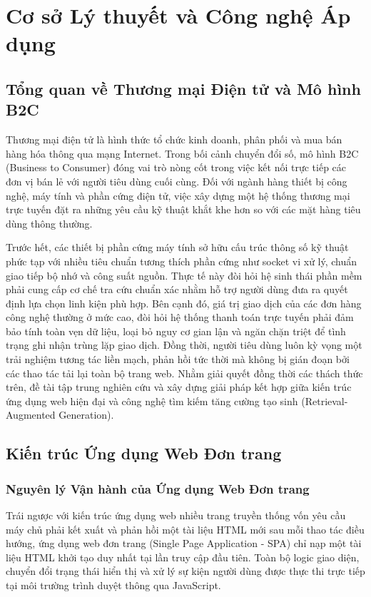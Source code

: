 \chapter{Cơ sở Lý thuyết và Công nghệ Áp dụng}

\section{Tổng quan về Thương mại Điện tử và Mô hình B2C}
Thương mại điện tử là hình thức tổ chức kinh doanh, phân phối và mua bán hàng hóa thông qua mạng Internet. Trong bối cảnh chuyển đổi số, mô hình B2C (Business to Consumer) đóng vai trò nòng cốt trong việc kết nối trực tiếp các đơn vị bán lẻ với người tiêu dùng cuối cùng. Đối với ngành hàng thiết bị công nghệ, máy tính và phần cứng điện tử, việc xây dựng một hệ thống thương mại trực tuyến đặt ra những yêu cầu kỹ thuật khắt khe hơn so với các mặt hàng tiêu dùng thông thường.

Trước hết, các thiết bị phần cứng máy tính sở hữu cấu trúc thông số kỹ thuật phức tạp với nhiều tiêu chuẩn tương thích phần cứng như socket vi xử lý, chuẩn giao tiếp bộ nhớ và công suất nguồn. Thực tế này đòi hỏi hệ sinh thái phần mềm phải cung cấp cơ chế tra cứu chuẩn xác nhằm hỗ trợ người dùng đưa ra quyết định lựa chọn linh kiện phù hợp. Bên cạnh đó, giá trị giao dịch của các đơn hàng công nghệ thường ở mức cao, đòi hỏi hệ thống thanh toán trực tuyến phải đảm bảo tính toàn vẹn dữ liệu, loại bỏ nguy cơ gian lận và ngăn chặn triệt để tình trạng ghi nhận trùng lặp giao dịch. Đồng thời, người tiêu dùng luôn kỳ vọng một trải nghiệm tương tác liền mạch, phản hồi tức thời mà không bị gián đoạn bởi các thao tác tải lại toàn bộ trang web. Nhằm giải quyết đồng thời các thách thức trên, đề tài tập trung nghiên cứu và xây dựng giải pháp kết hợp giữa kiến trúc ứng dụng web hiện đại và công nghệ tìm kiếm tăng cường tạo sinh (Retrieval-Augmented Generation).

\section{Kiến trúc Ứng dụng Web Đơn trang}
\subsection{Nguyên lý Vận hành của Ứng dụng Web Đơn trang}
Trái ngược với kiến trúc ứng dụng web nhiều trang truyền thống vốn yêu cầu máy chủ phải kết xuất và phản hồi một tài liệu HTML mới sau mỗi thao tác điều hướng, ứng dụng web đơn trang (Single Page Application - SPA) chỉ nạp một tài liệu HTML khởi tạo duy nhất tại lần truy cập đầu tiên. Toàn bộ logic giao diện, chuyển đổi trạng thái hiển thị và xử lý sự kiện người dùng được thực thi trực tiếp tại môi trường trình duyệt thông qua JavaScript.

